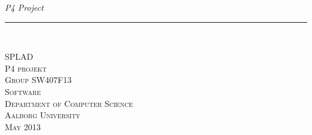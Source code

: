 \thispagestyle{empty}
\begin{flushright}
\vspace{3cm}

\phantom{hul}

\phantom{hul}

\phantom{hul}

\textsl{P4 Project} \\ \vspace{1cm}

\rule{0.8\textwidth}{3mm} \\ \vspace{1.5cm}
\vspace{1cm}


\vspace{2cm} 
\textsc{\Large SPLAD \\
P4 projekt\\
Group SW407F13\\
Software\\
Department of Computer Science\\
Aalborg University\\
May 2013\\
}
\end{flushright}
